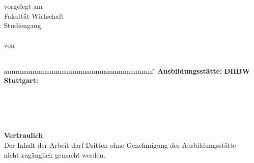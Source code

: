 \begin{titlepage}
	\begin{longtable}{p{} p{}}
	\end{longtable}
	\begin{center}
	\begin{doublespace}
	  \vspace*{12mm}	{\LARGE\bf \titel }\\
	  \vspace*{12mm}	{\large\bf \arbeit}\\
	\end{doublespace}  
	  \vspace*{12mm}	vorgelegt am \datumAbgabe\\
	  \vspace*{12mm}	Fakultät Wirtschaft\\
	  \vspace*{3mm} 	Studiengang \studiengang\\
	 \vspace*{3mm} 	{\kurs}\\
	  \vspace*{12mm}	von\\
	  \vspace*{3mm} 	{\large\bf \autor}\\
	  
	  
	\end{center}
	\vfill
	\begin{spacing}{1.2}
	\begin{tabbing}
		mmmmmmmmmmmmmmmmmmmmmmmmmm     \= \kill
		\textbf{Ausbildungsstätte:}	   \> \textbf{DHBW Stuttgart:} \\
		\firma						   \>  \\
		\betreuertitel				   \>  \\
		\betreuerfirma				   \>  \betreuer\\
		\funktion				   \>  \\
	\end{tabbing}
	\end{spacing}
	
	\begin{center}
	\textbf{Vertraulich}\\
	Der Inhalt der Arbeit darf Dritten ohne Genehmigung der Ausbildungsstätte nicht zugänglich gemacht werden.
	\end{center}
	
\end{titlepage}

